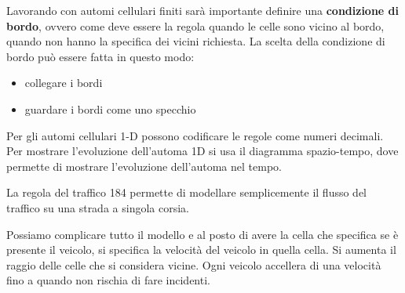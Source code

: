 Lavorando con automi cellulari finiti sarà importante definire una \textbf{condizione 
di bordo}, ovvero come deve essere la regola quando le celle sono vicino al bordo,
quando non hanno la specifica dei vicini richiesta. La scelta della condizione di
bordo può essere fatta in questo modo:
\begin{itemize}
    \item collegare i bordi
    \item guardare i bordi come uno specchio
\end{itemize}

Per gli automi cellulari 1-D possono codificare le regole come numeri decimali.
Per mostrare l'evoluzione dell'automa 1D si usa il diagramma spazio-tempo, dove 
permette di mostrare l'evoluzione dell'automa nel tempo.   

\begin{esempio}[Traffico]
    La regola del traffico 184 permette di modellare semplicemente il flusso del
    traffico su una strada a singola corsia.

    Possiamo complicare tutto il modello e al posto di avere la cella che specifica
    se è presente il veicolo, si specifica la velocità del veicolo in quella cella.
    Si aumenta il raggio delle celle che si considera vicine. Ogni veicolo accellera 
    di una velocità fino a quando non rischia di fare incidenti.
\end{esempio}
 